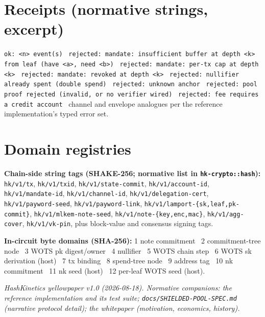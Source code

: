 \documentclass[10pt]{article}
\newcommand{\ct}[1]{\texttt{#1}}
\begin{document}
\section{Receipts (normative strings, excerpt)}
\ct{ok: <n> event(s)} \textperiodcentered\ \ct{rejected: mandate: insufficient buffer at depth <k> from leaf (have <a>, need <b>)} \textperiodcentered\ \ct{rejected: mandate: per-tx cap at depth <k>} \textperiodcentered\ \ct{rejected: mandate: revoked at depth <k>} \textperiodcentered\ \ct{rejected: nullifier already spent (double spend)} \textperiodcentered\ \ct{rejected: unknown anchor} \textperiodcentered\ \ct{rejected: pool proof rejected (invalid, or no verifier wired)} \textperiodcentered\ \ct{rejected: fee requires a credit account} \textperiodcentered\ channel and envelope analogues per the reference implementation's typed error set.

\section{Domain registries}\label{sec:registry}
\textbf{Chain-side string tags (SHAKE-256; normative list in \ct{hk-crypto::hash}):} \ct{hk/v1/tx}, \ct{hk/v1/txid}, \ct{hk/v1/state-commit}, \ct{hk/v1/account-id}, \ct{hk/v1/mandate-id}, \ct{hk/v1/channel-id}, \ct{hk/v1/delegation-cert}, \ct{hk/v1/payword-seed}, \ct{hk/v1/payword-link}, \ct{hk/v1/lamport-\{sk,leaf,pk-commit\}}, \ct{hk/v1/mlkem-note-seed}, \ct{hk/v1/note-\{key,enc,mac\}}, \ct{hk/v1/agg-cover}, \ct{hk/v1/vk-pin}, plus block-value and consensus signing tags.

\textbf{In-circuit byte domains (SHA-256):} 1 note commitment \textperiodcentered\ 2 commitment-tree node \textperiodcentered\ 3 WOTS pk digest/owner \textperiodcentered\ 4 nullifier \textperiodcentered\ 5 WOTS chain step \textperiodcentered\ 6 WOTS sk derivation (host) \textperiodcentered\ 7 tx binding \textperiodcentered\ 8 spend-tree node \textperiodcentered\ 9 address tag \textperiodcentered\ 10 nk commitment \textperiodcentered\ 11 nk seed (host) \textperiodcentered\ 12 per-leaf WOTS seed (host).

\vspace{0.6em}
\noindent\small\emph{HashKinetics yellowpaper v1.0 (2026-08-18). Normative companions: the reference implementation and its test suite; \ct{docs/SHIELDED-POOL-SPEC.md} (narrative protocol detail); the whitepaper (motivation, economics, history).}
\end{document}
